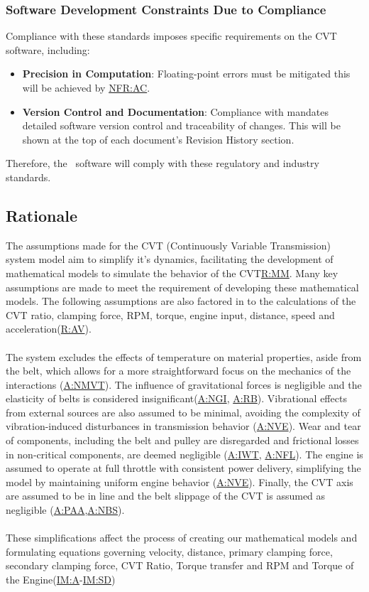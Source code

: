 \documentclass[12pt]{article}
\newcommand{\hpref}[1]{\hyperref[#1]{#1}}
\begin{document}
\subsubsection{Software Development Constraints Due to Compliance}
Compliance with these standards imposes specific requirements on the CVT software, including:
\begin{itemize}
    \item \textbf{Precision in Computation}: Floating-point errors must be mitigated this will be achieved by \hpref{NFR:AC}.
    \item \textbf{Version Control and Documentation}: Compliance with \cite{ISO26262Standard} mandates detailed software version control and traceability of changes. This will be shown at the top of each document's Revision History section. 
\end{itemize}

\noindent Therefore, the \progname \ software will comply with these regulatory and industry standards.


\subsection{Rationale}

The assumptions made for the CVT (Continuously Variable Transmission) system model aim to simplify it's dynamics, facilitating the development of mathematical models to simulate the behavior of the CVT{\hpref{R:MM}}. 
Many key assumptions are made to meet the requirement of developing these mathematical models. The following assumptions are also factored in to the calculations of the CVT ratio, clamping force, RPM, torque, engine input, distance, speed and acceleration(\hpref{R:AV}). 
\\\\
\noindent The system excludes the effects of temperature on material properties, aside from the belt, which allows for a more straightforward focus on the mechanics of the interactions (\hpref{A:NMVT}).
The influence of gravitational forces is negligible and the elasticity of belts is considered insignificant(\hpref{A:NGI}, \hpref{A:RB}). 
Vibrational effects from external sources are also assumed to be minimal, avoiding the complexity of vibration-induced disturbances in transmission behavior (\hpref{A:NVE}).
Wear and tear of components, including the belt and pulley are disregarded and frictional losses in non-critical components, are deemed negligible (\hpref{A:IWT}, \hpref{A:NFL}). 
The engine is assumed to operate at full throttle with consistent power delivery, simplifying the model by maintaining uniform engine behavior (\hpref{A:NVE}).
Finally, the CVT axis are assumed to be in line and the belt slippage of the CVT is assumed as negligible (\hpref{A:PAA},\hpref{A:NBS}). 
\\\\
\noindent These simplifications affect the process of creating our mathematical models and formulating equations governing velocity, distance, primary clamping force, secondary clamping force, CVT Ratio, Torque transfer and RPM and Torque of the Engine(\hpref{IM:A}-\hpref{IM:SD})
\end{document}

